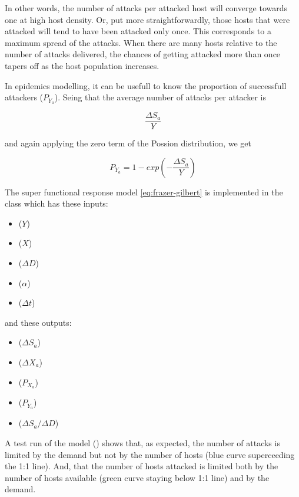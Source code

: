 In other words, the number of attacks per attacked host will converge towards one at high host density. Or, put more straightforwardly, those hosts that were attacked will tend to have been attacked only once. This corresponds to a maximum spread of the attacks. When there are many hosts relative to the number of attacks delivered, the chances of getting attacked more than once tapers off as the host population increases.

In epidemics modelling, it can be usefull to know the proportion of successfull attackers ($P_{Y_a}$). Seing that the average number of attacks per attacker is

\begin{equation*}
  \frac{\Delta S_a}{Y}
\end{equation*}

\noindent and again applying the zero term of the Possion distribution, we get 

\begin{equation}
  P_{Y_a} = 1 - exp\left(-\frac{\Delta S_a}{Y}\right)
\end{equation}


The super functional response model \eqref{eq:frazer-gilbert} is implemented in the  class which has these inputs:

\begin{itemize}
\item {} ($Y$)
\item {} ($X$)
\item {} ($\Delta D$)
\item {} ($\alpha$)
\item {} ($\Delta t$)
\end{itemize}

\noindent and these outputs:
\begin{itemize}
\item {} ($\Delta S_a$)
\item {} ($\Delta X_a$)
\item {} ($P_{X_a}$)
\item {} ($P_{Y_a}$)
\item {} ($\Delta S_a/\Delta D$)
\end{itemize}

A test run of the model () shows that, as expected, the number of attacks is limited by the demand but not by the number of hosts (blue curve superceeding the 1:1 line). And, that the number of hosts attacked is limited both by the number of hosts available (green curve staying below 1:1 line) and by the demand. 

